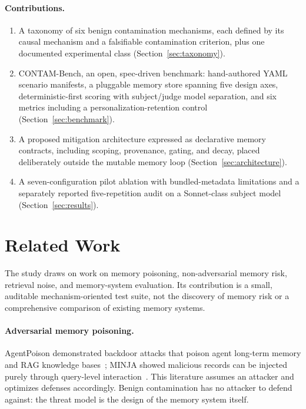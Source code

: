 \documentclass[11pt]{article}
\begin{document}
\paragraph{Contributions.}
\begin{enumerate}[leftmargin=*, itemsep=2pt]
  \item A taxonomy of six benign contamination mechanisms, each defined by
        its causal mechanism and a falsifiable contamination criterion,
        plus one documented experimental class
        (Section~\ref{sec:taxonomy}).
  \item CONTAM-Bench, an open, spec-driven benchmark: hand-authored YAML
        scenario manifests, a pluggable memory store spanning five design
        axes, deterministic-first scoring with subject/judge model
        separation, and six metrics including a personalization-retention
        control (Section~\ref{sec:benchmark}).
      \item A proposed mitigation architecture expressed as declarative
      memory contracts, including scoping, provenance, gating, and decay,
      placed
        deliberately outside the mutable memory loop
        (Section~\ref{sec:architecture}).
      \item A seven-configuration pilot ablation with bundled-metadata limitations
        and a separately reported five-repetition audit on a Sonnet-class
        subject model
        (Section~\ref{sec:results}).
\end{enumerate}

\section{Related Work}
\label{sec:related}

The study draws on work on memory poisoning, non-adversarial memory risk,
retrieval noise, and memory-system evaluation. Its contribution is a small,
auditable mechanism-oriented test suite, not the discovery of memory risk
or a comprehensive comparison of existing memory systems.

\paragraph{Adversarial memory poisoning.}
AgentPoison demonstrated backdoor attacks that poison agent long-term memory
and RAG knowledge bases~\cite{chen2024agentpoison}; MINJA showed malicious
records can be injected purely through query-level
interaction~\cite{dong2025minja}. This literature assumes an attacker and optimizes defenses
accordingly. Benign contamination has no attacker to defend against: the
threat model is the design of the memory system itself.
\end{document}
